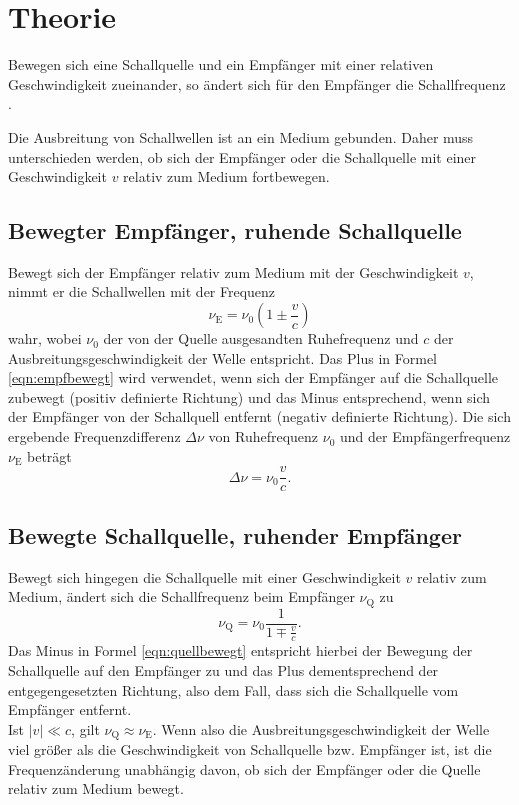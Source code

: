 \section{Theorie}
\label{sec:Theorie}

Bewegen sich eine Schallquelle und ein Empfänger mit einer relativen Geschwindigkeit
zueinander, so ändert sich für den Empfänger die Schallfrequenz \cite{demtröder}.

Die Ausbreitung von Schallwellen ist an ein Medium gebunden.
Daher muss unterschieden werden, ob sich der Empfänger oder die Schallquelle mit einer
Geschwindigkeit $v$ relativ zum Medium fortbewegen.

\subsection{Bewegter Empfänger, ruhende Schallquelle}
Bewegt sich der Empfänger relativ zum Medium mit der Geschwindigkeit $v$, nimmt er die
Schallwellen mit der Frequenz
\begin{equation}
	\label{eqn:empfbewegt}
	\nu_{\mathrm{E}} = \nu_0 ( 1 \pm \frac{v}{c} )
\end{equation}
wahr, wobei $\nu_0$ der von der Quelle ausgesandten Ruhefrequenz und $c$ der
Ausbreitungsgeschwindigkeit der Welle entspricht.
Das Plus in Formel \eqref{eqn:empfbewegt} wird verwendet, wenn sich der Empfänger auf die
Schallquelle zubewegt (positiv definierte Richtung) und das Minus entsprechend,
wenn sich der Empfänger von der Schallquell entfernt (negativ definierte Richtung).
Die sich ergebende Frequenzdifferenz $\Delta \nu$ von Ruhefrequenz $\nu_0$ und der
Empfängerfrequenz $\nu_{\mathrm{E}}$ beträgt
\begin{equation*}
	\Delta \nu = \nu_0 \frac{v}{c} \mathrm{.}
\end{equation*}

\subsection{Bewegte Schallquelle, ruhender Empfänger}
Bewegt sich hingegen die Schallquelle mit einer Geschwindigkeit $v$ relativ zum Medium,
ändert sich die Schallfrequenz beim Empfänger $\nu_{\mathrm{Q}}$ zu
\begin{equation}
	\label{eqn:quellbewegt}
	\nu_{\mathrm{Q}}=\nu_0 \frac{1}{1 \mp \frac{v}{c}} \mathrm{.}
\end{equation}
Das Minus in Formel \eqref{eqn:quellbewegt} entspricht hierbei der Bewegung der Schallquelle
auf den Empfänger zu und das Plus dementsprechend der entgegengesetzten Richtung, also dem
Fall, dass sich die Schallquelle vom Empfänger entfernt.\\
Ist $|v| \ll c$, gilt $\nu_{\mathrm{Q}} \approx \nu_{\mathrm{E}}$. Wenn also die
Ausbreitungsgeschwindigkeit der Welle viel größer als die Geschwindigkeit von Schallquelle bzw.
Empfänger ist, ist die Frequenzänderung unabhängig davon, ob sich der Empfänger oder die
Quelle relativ zum Medium bewegt.
